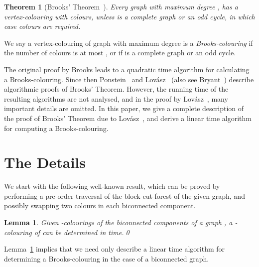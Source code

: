 \documentclass{article}
\newtheorem{lemma}{Lemma}
\newtheorem{theorem}{Theorem}
\begin{document}
\begin{theorem}[Brooks' Theorem~\cite{Brooks41}]
Every graph  with maximum degree , has a vertex-colouring with 
colours, unless  is a complete graph or an odd cycle, in which case  colours
are required.
\end{theorem}

We say a vertex-colouring of graph  with maximum degree  is a
\emph{Brooks-colouring} if the number of colours is at most , or  if
 is a complete graph or an odd cycle. 

The original proof by Brooks leads to a quadratic time algorithm for
calculating a Brooks-colouring. Since then  Ponstein~\cite{Ponstein69} and
Lov{\'a}sz~\cite{Lovasz75} (also see Bryant~\cite{Bryant96}) describe
algorithmic proofs of Brooks' Theorem. However, the running time of the
resulting algorithms are not analysed, and in the proof by
Lov{\'a}sz~\cite{Lovasz75}, many important details are omitted.
In this paper, we give a complete description of the proof of Brooks' Theorem
due to Lov{\'a}sz~\cite{Lovasz75}, and derive a linear time algorithm for
computing a Brooks-colouring.  


\section{The Details}

We start with the following well-known result,
which can be proved by performing a pre-order traversal of the block-cut-forest
of the given graph, and possibly swapping two colours in each biconnected
component.

\begin{lemma}
\label{lem:NonBiconnected}
Given -colourings of the biconnected components of a graph , a -colouring
of  can be determined in  time.\qed
\end{lemma}


Lemma~\ref{lem:NonBiconnected} implies that we need only describe a linear time
algorithm  for determining a Brooks-colouring in the case of a biconnected
graph. 
\end{document}
